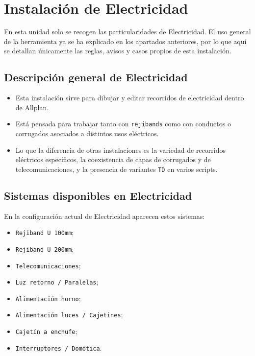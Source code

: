 \documentclass[12pt,a4paper]{article}
\begin{document}
\section{Instalación de Electricidad}

En esta unidad solo se recogen las particularidades de Electricidad. El uso general de la herramienta ya se ha explicado en los apartados anteriores, por lo que aquí se detallan únicamente las reglas, avisos y casos propios de esta instalación.

\subsection{Descripción general de Electricidad}

\begin{itemize}
\item Esta instalación sirve para dibujar y editar recorridos de electricidad dentro de Allplan.
\item Está pensada para trabajar tanto con \texttt{rejibands} como con conductos o corrugados asociados a distintos usos eléctricos.
\item Lo que la diferencia de otras instalaciones es la variedad de recorridos eléctricos específicos, la coexistencia de capas de corrugados y de telecomunicaciones, y la presencia de variantes \texttt{TD} en varios scripts.
\end{itemize}

\subsection{Sistemas disponibles en Electricidad}

En la configuración actual de Electricidad aparecen estos sistemas:

\begin{itemize}
\item \texttt{Rejiband U 100mm};
\item \texttt{Rejiband U 200mm};
\item \texttt{Telecomunicaciones};
\item \texttt{Luz retorno / Paralelas};
\item \texttt{Alimentación horno};
\item \texttt{Alimentación luces / Cajetines};
\item \texttt{Cajetín a enchufe};
\item \texttt{Interruptores / Domótica}.
\end{itemize}
\end{document}
